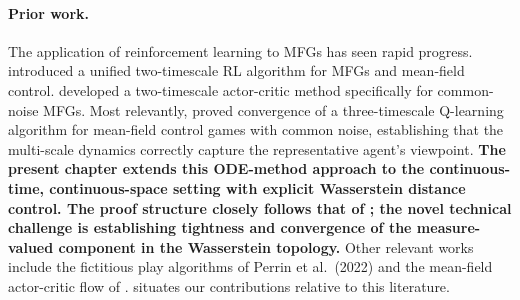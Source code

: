 \paragraph{Prior work.} The application of reinforcement learning to MFGs has seen
rapid progress. \citep{angiulietal2022} introduced a unified
two-timescale RL algorithm for MFGs and mean-field control. \citep{hulauriere2023}
developed a two-timescale actor-critic method specifically for common-noise MFGs.
Most relevantly, \citep{angiulietal2024} proved convergence of a
three-timescale Q-learning algorithm for mean-field control games with common noise,
establishing that the multi-scale dynamics correctly capture the representative
agent's viewpoint. \textbf{The present chapter extends this ODE-method approach to
the continuous-time, continuous-space setting with explicit Wasserstein distance
control. The proof structure closely follows that of \citep{angiulietal2024}; the novel
technical challenge is establishing tightness and convergence of the measure-valued
component in the Wasserstein topology.} Other relevant works include the fictitious
play algorithms of Perrin et al.\ (2022) and the mean-field actor-critic flow of \citep{zhouzhouhu2025}.  situates our contributions relative to
this literature.

\begin{table}[ht]
\centering
\small
\caption{Comparison of RL for MFG Convergence Results}
\label{tab:rl-comparison}
\end{table}

